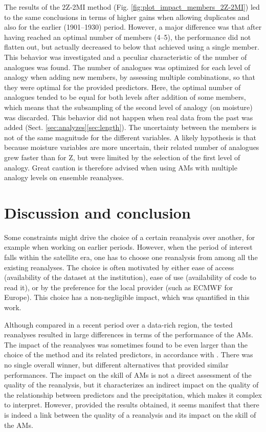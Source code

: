 \documentclass{ametsoc}
\begin{document}
	The results of the 2Z-2MI method (Fig. \ref{fig:plot_impact_members_2Z-2MI}) led to the same conclusions in terms of higher gains when allowing duplicates and also for the earlier (1901--1930) period. However, a major difference was that after having reached an optimal number of members (4--5), the performance did not flatten out, but actually decreased to below that achieved using a single member. This behavior was investigated and a peculiar characteristic of the number of analogues was found. The number of analogues was optimized for each level of analogy when adding new members, by assessing multiple combinations, so that they were optimal for the provided predictors. Here, the optimal number of analogues tended to be equal for both levels after addition of some members, which means that the subsampling of the second level of analogy (on moisture) was discarded. This behavior did not happen when real data from the past was added (Sect. \ref{sec:analyzes}\ref{sec:length}). The uncertainty between the members is not of the same magnitude for the different variables. A likely hypothesis is that because moisture variables are more uncertain, their related number of analogues grew faster than for Z, but were limited by the selection of the first level of analogy. Great caution is therefore advised when using AMs with multiple analogy levels on ensemble reanalyses.
	
	
	\section{Discussion and conclusion}
	\label{sec:discussion-conclusion}
	
	Some constraints might drive the choice of a certain reanalysis over another, for example when working on earlier periods. However, when the period of interest falls within the satellite era, one has to choose one reanalysis from among all the existing reanalyses. The choice is often motivated by either ease of access (availability of the dataset at the institution), ease of use (availability of code to read it), or by the preference for the local provider (such as ECMWF for Europe). This choice has a non-negligible impact, which was quantified in this work.
	
	Although compared in a recent period over a data-rich region, the tested reanalyses resulted in large differences in terms of the performance of the AMs. The impact of the reanalyses was sometimes found to be even larger than the choice of the method and its related predictors, in accordance with \citet{Dayon2015}. There was no single overall winner, but different alternatives that provided similar performances. The impact on the skill of AMs is not a direct assessment of the quality of the reanalysis, but it characterizes an indirect impact on the quality of the relationship between predictors and the precipitation, which makes it complex to interpret. However, provided the results obtained, it seems manifest that there is indeed a link between the quality of a reanalysis and its impact on the skill of the AMs.
	
\end{document}
